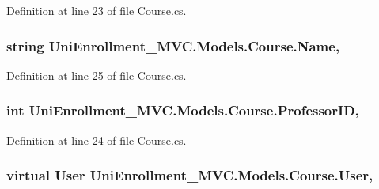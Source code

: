 Definition at line 23 of file Course.\+cs.

\subsubsection[{\texorpdfstring{Name}{Name}}]{\setlength{\rightskip}{0pt plus 5cm}string Uni\+Enrollment\+\_\+\+M\+V\+C.\+Models.\+Course.\+Name\hspace{0.3cm}{\ttfamily [get]}, {\ttfamily [set]}}\hypertarget{class_uni_enrollment___m_v_c_1_1_models_1_1_course_abfc84d1ebf575b4d63af03728bc8c7ab}{}\label{class_uni_enrollment___m_v_c_1_1_models_1_1_course_abfc84d1ebf575b4d63af03728bc8c7ab}


Definition at line 25 of file Course.\+cs.

\subsubsection[{\texorpdfstring{Professor\+ID}{ProfessorID}}]{\setlength{\rightskip}{0pt plus 5cm}int Uni\+Enrollment\+\_\+\+M\+V\+C.\+Models.\+Course.\+Professor\+ID\hspace{0.3cm}{\ttfamily [get]}, {\ttfamily [set]}}\hypertarget{class_uni_enrollment___m_v_c_1_1_models_1_1_course_a9b8fd37bc922506e6abc112c782be3f0}{}\label{class_uni_enrollment___m_v_c_1_1_models_1_1_course_a9b8fd37bc922506e6abc112c782be3f0}


Definition at line 24 of file Course.\+cs.

\subsubsection[{\texorpdfstring{User}{User}}]{\setlength{\rightskip}{0pt plus 5cm}virtual {\bf User} Uni\+Enrollment\+\_\+\+M\+V\+C.\+Models.\+Course.\+User\hspace{0.3cm}{\ttfamily [get]}, {\ttfamily [set]}}\hypertarget{class_uni_enrollment___m_v_c_1_1_models_1_1_course_a6a070699f04335e845a19a8402e25861}{}\label{class_uni_enrollment___m_v_c_1_1_models_1_1_course_a6a070699f04335e845a19a8402e25861}


